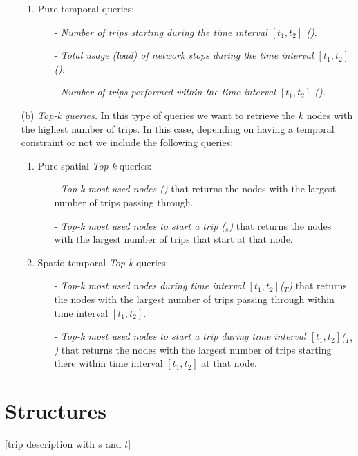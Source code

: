 \begin{itemize}
\begin{enumerate}
			\item Pure temporal queries:
			\begin{itemize}
				\item[-] {\em Number of trips starting during the time interval $[t_1,t_2]$ (\startT). } 
				\item[-] {\em Total usage (load) of network stops during the time interval $[t_1,t_2]$ (\loadT).}
				\item[-] {\em Number of trips performed within the time interval $[t_1,t_2]$ (\tripT).} 
			\end{itemize}
		\end{enumerate}
		
		\item[(b)] {\em Top-k queries.} In this type of queries we want to retrieve the $k$ nodes with the highest number of trips. In this case, depending on having a temporal constraint or not we include the following queries:
		\begin{enumerate}
			\item Pure spatial {\em Top-k} queries:
			\begin{itemize}
				\item[-] {\em Top-k most used nodes (\topK)} that returns the nodes with the largest number of trips passing through.
				\item[-] {\em Top-k most used nodes to start a trip (\topK$_s$)} that returns the nodes with the largest number of trips that start at that node.
			\end{itemize}
			
			\item Spatio-temporal {\em Top-k}  queries:
			\begin{itemize}
				\item[-] {\em Top-k most used nodes during time interval $[t_1,t_2]$(\topK$_T$)} that returns the nodes with the largest number of trips passing through within time interval $[t_1,t_2]$. 
				\item[-] {\em Top-k most used nodes to start a trip during time interval $[t_1,t_2]$(\topK$_{Ts}$)} that returns the nodes with the largest number of trips starting there within time interval $[t_1,t_2]$ at that node.
			\end{itemize}
		\end{enumerate}
	\end{itemize}

\section{Structures}
	[trip description with $s$ and $t$]

